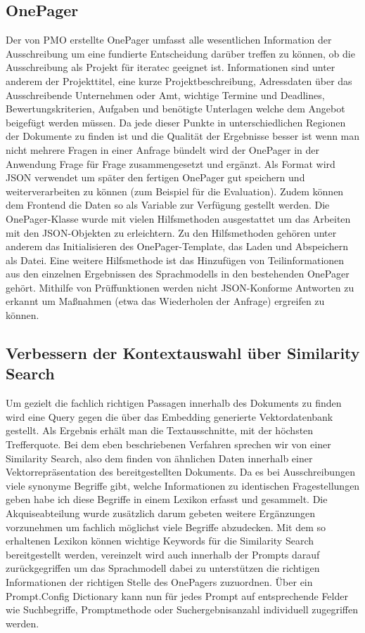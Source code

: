 \subsection{OnePager}
Der von PMO erstellte OnePager umfasst alle wesentlichen Information der Ausschreibung um eine fundierte Entscheidung
darüber treffen zu können, ob die Ausschreibung als Projekt für iteratec geeignet ist. Informationen sind unter anderem
der Projekttitel, eine kurze Projektbeschreibung, Adressdaten über das Ausschreibende Unternehmen oder Amt, wichtige
Termine und Deadlines, Bewertungskriterien, Aufgaben und benötigte Unterlagen welche dem Angebot beigefügt werden
müssen. Da jede dieser Punkte in unterschiedlichen Regionen der Dokumente zu finden ist und die Qualität der Ergebnisse
besser ist wenn man nicht mehrere Fragen in einer Anfrage bündelt wird der OnePager in der Anwendung Frage für Frage
zusammengesetzt und ergänzt. Als Format wird JSON verwendet um später den fertigen OnePager gut speichern und
weiterverarbeiten zu können (zum Beispiel für die Evaluation). Zudem können dem Frontend die Daten so als Variable zur
Verfügung gestellt werden. Die OnePager-Klasse wurde mit vielen Hilfsmethoden ausgestattet um das Arbeiten mit den
JSON-Objekten zu erleichtern. Zu den Hilfsmethoden gehören unter anderem das Initialisieren des OnePager-Template, das
Laden und Abspeichern als Datei. Eine weitere Hilfsmethode ist das Hinzufügen von Teilinformationen aus den einzelnen
Ergebnissen des Sprachmodells in den bestehenden OnePager gehört. Mithilfe von Prüffunktionen werden nicht JSON-Konforme
Antworten zu erkannt um Maßnahmen (etwa das Wiederholen der Anfrage) ergreifen zu können.

\subsection{Verbessern der Kontextauswahl über Similarity Search}
\label{chap:Verbessern der Kontextauswahl über Similarity Search}
Um gezielt die fachlich richtigen Passagen innerhalb des Dokuments zu finden wird eine Query gegen die über das
Embedding generierte Vektordatenbank gestellt. Als Ergebnis erhält man die Textausschnitte, mit der höchsten
Trefferquote. Bei dem eben beschriebenen Verfahren sprechen wir von einer Similarity Search, also dem finden von
ähnlichen Daten innerhalb einer Vektorrepräsentation des bereitgestellten Dokuments. Da es bei Ausschreibungen viele
synonyme Begriffe gibt, welche Informationen zu identischen Fragestellungen geben habe ich diese Begriffe in einem
Lexikon erfasst und gesammelt. Die Akquiseabteilung wurde zusätzlich darum gebeten weitere Ergänzungen vorzunehmen um
fachlich möglichst viele Begriffe abzudecken. Mit dem so erhaltenen Lexikon können wichtige Keywords für die Similarity
Search bereitgestellt werden, vereinzelt wird auch innerhalb der Prompts darauf zurückgegriffen um das Sprachmodell
dabei zu unterstützen die richtigen Informationen der richtigen Stelle des OnePagers zuzuordnen. Über ein Prompt.Config
Dictionary kann nun für jedes Prompt auf entsprechende Felder wie Suchbegriffe, Promptmethode oder Suchergebnisanzahl
individuell zugegriffen werden.

